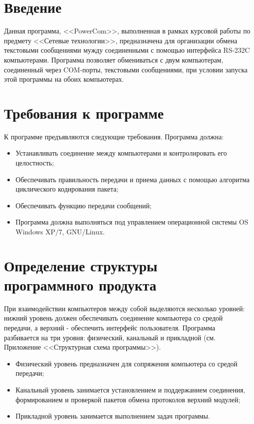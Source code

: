 \documentclass[russian,utf8,simple,emptystyle]{eskdtext}
\begin{document}
\maketitle
\tableofcontents
\newpage
\section{Введение}

Данная программа, <<PowerCom>>, выполненная в рамках курсовой работы по предмету <<Сетевые технологии>>, предназначена для организации обмена текстовыми сообщениями мужду соединенными с помощью интерфейса RS-232C компьютерами. Программа позволяет обмениваться с двум компьютерам, соединенный через COM-порты, текстовыми сообщениями, при условии запуска этой программы на обоих компьютерах.

\section{Требования к программе}
К программе предъявляются следующие требования. Программа должна:
\begin{itemize}
\item Устанавливать соединение между компьютерами и контролировать его целостность;
\item Обеспечивать правильность передачи и приема данных с помощью алгоритма циклического кодирования пакета;
\item Обеспечивать функцию передачи сообщений;
\item Программа должна выполняться под управлением операционной системы OS Windows XP/7, GNU/Linux.
\end{itemize}

\section{Определение структуры программного продукта}
При взаимодействии компьютеров между собой выделяются несколько уровней: нижний уровень должен обеспечивать соединение компьютера со средой передачи, а верхний - обеспечить интерфейс пользователя. Программа разбивается на три уровня: физический, канальный и прикладной (см. Приложение <<Структурная схема программы>>).
\begin{itemize}
\item Физический уровень предназначен для сопряжения компьютера со средой передачи;
\item Канальный уровень занимается установлением и поддержанием соединения, формированием и проверкой пакетов обмена протоколов верхний модулей;
\item Прикладной уровень занимается выполнением задач программы.
\end{itemize}
\end{document}

